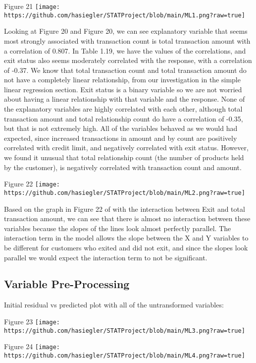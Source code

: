 \documentclass[
]{article}
\begin{document}
Figure 21
\texttt{[image: https://github.com/hasiegler/STATProject/blob/main/ML1.png?raw=true]}

Looking at Figure 20 and Figure 20, we can see explanatory variable that
seems most strongly associated with transaction count is total
transaction amount with a correlation of 0.807. In Table 1.19, we have
the values of the correlations, and exit status also seems moderately
correlated with the response, with a correlation of -0.37. We know that
total transaction count and total transaction amount do not have a
completely linear relationship, from our investigation in the simple
linear regression section. Exit status is a binary variable so we are
not worried about having a linear relationship with that variable and
the response. None of the explanatory variables are highly correlated
with each other, although total transaction amount and total
relationship count do have a correlation of -0.35, but that is not
extremely high. All of the variables behaved as we would had expected,
since increased transactions in amount and by count are positively
correlated with credit limit, and negatively correlated with exit
status. However, we found it unusual that total relationship count (the
number of products held by the customer), is negatively correlated with
transaction count and amount.

Figure 22
\texttt{[image: https://github.com/hasiegler/STATProject/blob/main/ML2.png?raw=true]}

Based on the graph in Figure 22 of with the interaction between Exit and
total transaction amount, we can see that there is almost no interaction
between these variables because the slopes of the lines look almost
perfectly parallel. The interaction term in the model allows the slope
between the X and Y variables to be different for customers who exited
and did not exit, and since the slopes look parallel we would expect the
interaction term to not be significant.

\hypertarget{variable-pre-processing-1}{%
\subsection{Variable Pre-Processing}\label{variable-pre-processing-1}}

Initial residual vs predicted plot with all of the untransformed
variables:

Figure 23
\texttt{[image: https://github.com/hasiegler/STATProject/blob/main/ML3.png?raw=true]}

Figure 24
\texttt{[image: https://github.com/hasiegler/STATProject/blob/main/ML4.png?raw=true]}
\end{document}
